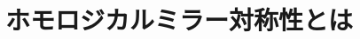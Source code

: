 \documentclass[aspectratio=169, dvipdfmx, 8pt, notheorems, uplatex]{beamer}
\begin{document}







\section{ホモロジカルミラー対称性とは}
\end{document}
